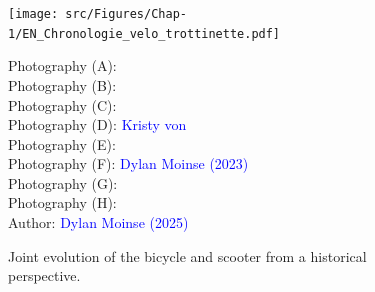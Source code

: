 \begin{refsegment}
\begin{figure}[h!]\vspace*{4pt}
        \caption{Joint evolution of the bicycle and scooter from a historical perspective.}
        \label{fig-chap1:frise-chronologique-velo-trottinette}
        \centerline{\texttt{[image: src/Figures/Chap-1/EN\_Chronologie\_velo\_trottinette.pdf]}}
        \vspace{5pt}
        \begin{flushright}\scriptsize{
        Photography (A): \textcolor{blue}{\textcite{smithsonian_draisine_2006}}
        \\
        Photography (B): \textcolor{blue}{\textcite{conservatoire_national_des_arts_et_metiers_velocipemichaux_2013}}
        \\
        Photography (C): \textcolor{blue}{\textcite{chateau_de_compiegne_grand-bi_nodate}}
        \\
        Photography (D): \textcolor{blue}{Kristy von} \textcolor{blue}{\textcite{moos_parcours_2019}}
        \\
        Photography (E): \textcolor{blue}{\textcite{alienor_bicyclette_2015}}
        \\
        Photography (F): \textcolor{blue}{Dylan Moinse (2023)}
        \\
        Photography (G): \textcolor{blue}{\textcite{musee_national_suisse_draisienne_2018}}
        \\
        Photography (H): \textcolor{blue}{\textcite{zerorider_lautoped_2023}}
        \\
        Author: \textcolor{blue}{Dylan Moinse (2025)}
      }\end{flushright}
    \end{figure}


\end{refsegment}
